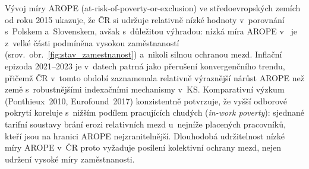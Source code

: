 Vývoj míry \ac{AROPE} (at-risk-of-poverty-or-exclusion) ve středoevropských zemích od roku 2015 ukazuje, že \ac{ČR} si udržuje relativně nízké hodnoty v~porovnání s~Polskem a~Slovenskem, avšak s~důležitou výhradou: nízká míra \ac{AROPE} v~ je z~velké části podmíněna vysokou zaměstnaností (srov.~obr.~\ref{fig:stav_zamestnanost}) a~nikoli silnou ochranou mezd.
Inflační epizoda 2021--2023 je v~datech patrná jako přerušení konvergenčního trendu, přičemž ČR v~tomto období zaznamenala relativně výraznější nárůst \ac{AROPE} než země s~robust­nějšími indexačními mechanismy v~\ac{KS}.
Komparativní výzkum (Ponthieux~2010, Eurofound~2017) konzistentně potvrzuje, že vyšší odborové pokrytí koreluje s~nižším podílem pracujících chudých (\emph{in-work poverty}): sjednané tarifní soustavy brání erozi relativních mezd u~nejníže placených pracovníků, kteří jsou na hranici \ac{AROPE} nejzranitelnější.
Dlouhodobá udržitelnost nízké míry \ac{AROPE} v~ČR proto vyžaduje posílení kolektivní ochrany mezd, nejen udržení vysoké míry zaměstnanosti.


